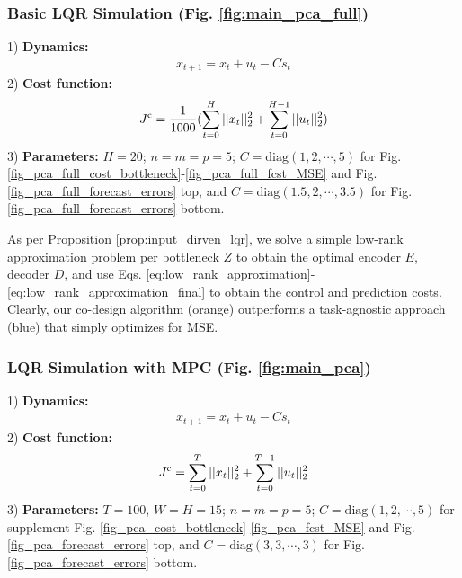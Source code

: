 \subsubsection{Basic LQR Simulation (Fig. \ref{fig:main_pca_full})}



1) \textbf{Dynamics:}
\begin{align*}
x_{t+1} = x_t + u_t - C s_t
\end{align*}
2) \textbf{Cost function:}
\begin{align*}
J^{\mathrm{c}} = \frac{1}{1000} (\sum_{t=0}^{H} ||x_t||^2_2 + \sum_{t=0}^{H-1} ||u_t||^2_2) 
\end{align*}
3) \textbf{Parameters:} $H = 20$; $n = m = p = 5$; $C=\text{diag}(1, 2, \cdots, 5)$ for Fig. \ref{fig_pca_full_cost_bottleneck}-\ref{fig_pca_full_fcst_MSE} and Fig. \ref{fig_pca_full_forecast_errors} top, and $C=\text{diag}(1.5, 2, \cdots, 3.5)$ for Fig. \ref{fig_pca_full_forecast_errors} bottom.

As per Proposition \ref{prop:input_dirven_lqr}, we solve a simple low-rank approximation problem per bottleneck $Z$ to obtain the optimal encoder $E$, decoder $D$, and use Eqs. \ref{eq:low_rank_approximation}-\ref{eq:low_rank_approximation_final} to obtain the control and prediction costs. Clearly, our co-design algorithm (orange) outperforms a task-agnostic approach (blue) that simply optimizes for MSE.

\subsubsection{LQR Simulation with MPC (Fig. \ref{fig:main_pca})}


1) \textbf{Dynamics:}
\begin{align*}
x_{t+1} = x_t + u_t - C s_t
\end{align*}
2) \textbf{Cost function:}
\begin{align*}
J^{\mathrm{c}} = \sum_{t=0}^{T} ||x_t||^2_2 + \sum_{t=0}^{T-1} ||u_t||^2_2 
\end{align*}
3) \textbf{Parameters:} $T = 100$, $W = H = 15$; $n = m = p = 5$; $C=\text{diag}(1, 2, \cdots, 5)$ for supplement Fig. \ref{fig_pca_cost_bottleneck}-\ref{fig_pca_fcst_MSE} and Fig. \ref{fig_pca_forecast_errors} top, and $C=\text{diag}(3, 3, \cdots, 3)$ for Fig. \ref{fig_pca_forecast_errors} bottom.


